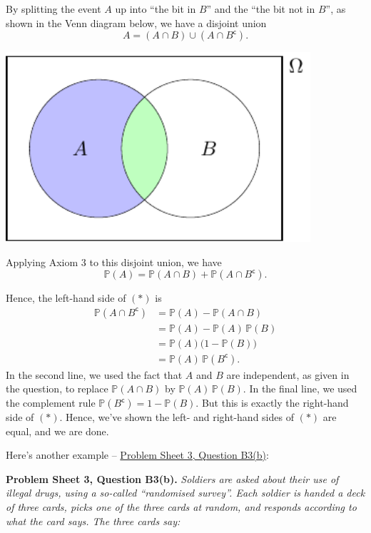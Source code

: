 \documentclass[
  a4paper,
]{book}
\theoremstyle{definition}
\theoremstyle{definition}
\theoremstyle{definition}
\theoremstyle{definition}
\theoremstyle{remark}
\begin{document}
By splitting the event \(A\) up into ``the bit in \(B\)'' and the ``the bit not in \(B\)'', as shown in the Venn diagram below, we have a disjoint union
\[ A = (A \cap B) \cup (A \cap B^\mathsf{c}) . \]

\begin{center}\includegraphics[width=320pt]{math1710_files/figure-latex/writing-pic-1-1} \end{center}

Applying Axiom 3 to this disjoint union, we have
\[ \mathbb P(A) = \mathbb P(A \cap B) + \mathbb P(A \cap B^\mathsf{c}) . \]

Hence, the left-hand side of \((*)\) is
\begin{align*}
\mathbb P(A \cap B^\mathsf{c})
&= \mathbb P(A) - \mathbb P(A \cap B) \\
&= \mathbb P(A) - \mathbb P(A)\,\mathbb P(B) \\
&= \mathbb P(A) \big(1 - \mathbb P(B)\big) \\
&= \mathbb P(A) \, \mathbb P(B^\mathsf{c}) .
\end{align*}
In the second line, we used the fact that \(A\) and \(B\) are independent, as given in the question, to replace \(\mathbb P(A \cap B)\) by \(\mathbb P(A)\,\mathbb P(B)\). In the final line, we used the complement rule \(\mathbb P(B^\mathsf{c}) = 1 - \mathbb P(B)\). But this is exactly the right-hand side of \((*)\).
Hence, we've shown the left- and right-hand sides of \((*)\) are equal, and we are done.

Here's another example -- \protect\hyperlink{P3-long}{Problem Sheet 3, Question B3(b)}:

\textbf{Problem Sheet 3, Question B3(b).} \emph{Soldiers are asked about their use of illegal drugs, using a so-called ``randomised survey''. Each soldier is handed a deck of three cards, picks one of the three cards at random, and responds according to what the card says. The three cards say:}
\end{document}
